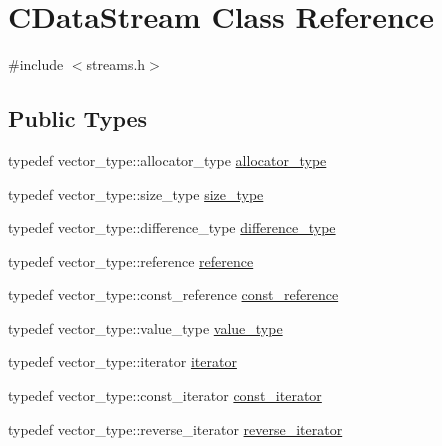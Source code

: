 \hypertarget{class_c_data_stream}{}\section{C\+Data\+Stream Class Reference}
\label{class_c_data_stream}


{\ttfamily \#include $<$streams.\+h$>$}

\subsection*{Public Types}
\begin{DoxyCompactItemize}
\item 
typedef vector\+\_\+type\+::allocator\+\_\+type \hyperlink{class_c_data_stream_a297dff00e40bb161aab89fde868ee7b1}{allocator\+\_\+type}
\item 
typedef vector\+\_\+type\+::size\+\_\+type \hyperlink{class_c_data_stream_a79e10daad6db0f94aea1e811eb167378}{size\+\_\+type}
\item 
typedef vector\+\_\+type\+::difference\+\_\+type \hyperlink{class_c_data_stream_a9da973fb6e53a5335db78b6f8b90bdbf}{difference\+\_\+type}
\item 
typedef vector\+\_\+type\+::reference \hyperlink{class_c_data_stream_a33723921305add93b45973243faf1541}{reference}
\item 
typedef vector\+\_\+type\+::const\+\_\+reference \hyperlink{class_c_data_stream_ada2ac4b4c962dd5a5dcccbc3f71e83ab}{const\+\_\+reference}
\item 
typedef vector\+\_\+type\+::value\+\_\+type \hyperlink{class_c_data_stream_a5572ddd57b7355f87781b89087dd18e0}{value\+\_\+type}
\item 
typedef vector\+\_\+type\+::iterator \hyperlink{class_c_data_stream_abed2013224bdf424e51c78bf483886d3}{iterator}
\item 
typedef vector\+\_\+type\+::const\+\_\+iterator \hyperlink{class_c_data_stream_abcfd79b72607505b22f18424e313b4c5}{const\+\_\+iterator}
\item 
typedef vector\+\_\+type\+::reverse\+\_\+iterator \hyperlink{class_c_data_stream_a93ca1c317b7080997a20b0cf1920b39c}{reverse\+\_\+iterator}
\end{DoxyCompactItemize}
